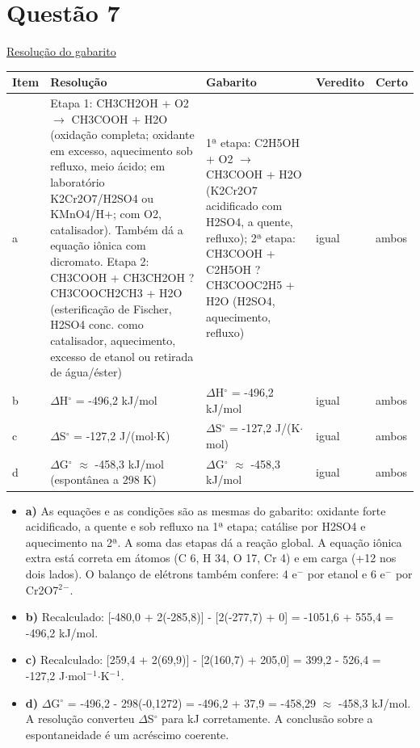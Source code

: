 \documentclass{article}%
\begin{document}
\section*{Questão 7}%
\href{https://poliedroresolve.sistemapoliedro.com.br/vestibulares/ita/2027/ita-2-fase-dia-2-21-10-2026-2-fase-dia-2/dissertativa-7-quimica-2-fase-dia-2-ita-2027}{Resolução do gabarito}\par\smallskip%
\begin{longtable}{@{}p{} p{} p{} p{} p{}@{}}\toprule Item & Resolução & Gabarito & Veredito & Certo \\ \midrule
a & Etapa 1: CH3CH2OH + O2 $\to$ CH3COOH + H2O (oxidação completa; oxidante em excesso, aquecimento sob refluxo, meio ácido; em laboratório K2Cr2O7/H2SO4 ou KMnO4/H+; com O2, catalisador). Também dá a equação iônica com dicromato. Etapa 2: CH3COOH + CH3CH2OH ? CH3COOCH2CH3 + H2O (esterificação de Fischer, H2SO4 conc. como catalisador, aquecimento, excesso de etanol ou retirada de água/éster) & 1ª etapa: C2H5OH + O2 $\to$ CH3COOH + H2O (K2Cr2O7 acidificado com H2SO4, a quente, refluxo); 2ª etapa: CH3COOH + C2H5OH ? CH3COOC2H5 + H2O (H2SO4, aquecimento, refluxo) & igual & ambos \\
b & $\Delta$H$^\circ$ = -496,2 kJ/mol & $\Delta$H$^\circ$ = -496,2 kJ/mol & igual & ambos \\
c & $\Delta$S$^\circ$ = -127,2 J/(mol$\cdot$K) & $\Delta$S$^\circ$ = -127,2 J/(K$\cdot$mol) & igual & ambos \\
d & $\Delta$G$^\circ$ $\approx$ -458,3 kJ/mol (espontânea a 298 K) & $\Delta$G$^\circ$ $\approx$ -458,3 kJ/mol & igual & ambos \\
\bottomrule\end{longtable}%
\begin{itemize}%
\item%
\textbf{a)} As equações e as condições são as mesmas do gabarito: oxidante forte acidificado, a quente e sob refluxo na 1ª etapa; catálise por H2SO4 e aquecimento na 2ª. A soma das etapas dá a reação global. A equação iônica extra está correta em átomos (C 6, H 34, O 17, Cr 4) e em carga (+12 nos dois lados). O balanço de elétrons também confere: 4 e$^{-}$ por etanol e 6 e$^{-}$ por Cr2O7$^2$$^{-}$.%
\item%
\textbf{b)} Recalculado: {[}-480,0 + 2(-285,8){]} - {[}2(-277,7) + 0{]} = -1051,6 + 555,4 = -496,2 kJ/mol.%
\item%
\textbf{c)} Recalculado: {[}259,4 + 2(69,9){]} - {[}2(160,7) + 205,0{]} = 399,2 - 526,4 = -127,2 J$\cdot$mol$^{-}$$^{1}$$\cdot$K$^{-}$$^{1}$.%
\item%
\textbf{d)} $\Delta$G$^\circ$ = -496,2 - 298(-0,1272) = -496,2 + 37,9 = -458,29 $\approx$ -458,3 kJ/mol. A resolução converteu $\Delta$S$^\circ$ para kJ corretamente. A conclusão sobre a espontaneidade é um acréscimo coerente.%
\end{itemize}%
\end{document}
